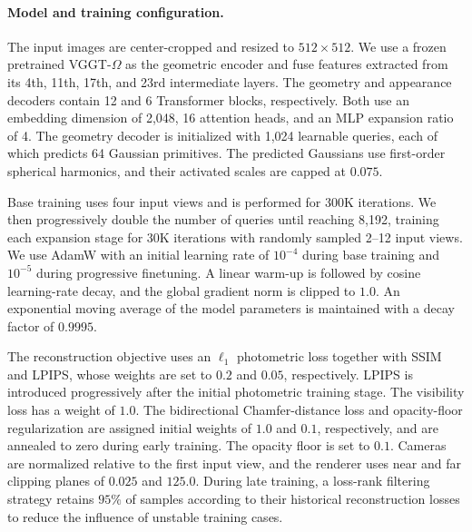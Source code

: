 \paragraph{Model and training configuration.}
The input images are center-cropped and resized to $512\times512$. We use a frozen pretrained VGGT-$\Omega$ as the geometric encoder and fuse features extracted from its 4th, 11th, 17th, and 23rd intermediate layers. The geometry and appearance decoders contain 12 and 6 Transformer blocks, respectively. Both use an embedding dimension of 2,048, 16 attention heads, and an MLP expansion ratio of 4. The geometry decoder is initialized with 1,024 learnable queries, each of which predicts 64 Gaussian primitives. The predicted Gaussians use first-order spherical harmonics, and their activated scales are capped at $0.075$.

Base training uses four input views and is performed for 300K iterations. We then progressively double the number of queries until reaching 8,192, training each expansion stage for 30K iterations with randomly sampled 2--12 input views. We use AdamW with an initial learning rate of $10^{-4}$ during base training and $10^{-5}$ during progressive finetuning. A linear warm-up is followed by cosine learning-rate decay, and the global gradient norm is clipped to $1.0$. An exponential moving average of the model parameters is maintained with a decay factor of $0.9995$.

The reconstruction objective uses an $\ell_1$ photometric loss together with SSIM and LPIPS, whose weights are set to $0.2$ and $0.05$, respectively. LPIPS is introduced progressively after the initial photometric training stage. The visibility loss has a weight of $1.0$. The bidirectional Chamfer-distance loss and opacity-floor regularization are assigned initial weights of $1.0$ and $0.1$, respectively, and are annealed to zero during early training. The opacity floor is set to $0.1$. Cameras are normalized relative to the first input view, and the renderer uses near and far clipping planes of $0.025$ and $125.0$. During late training, a loss-rank filtering strategy retains $95\%$ of samples according to their historical reconstruction losses to reduce the influence of unstable training cases.
























\ifdefined\AppendixIncluded
\else
  
  
\fi
